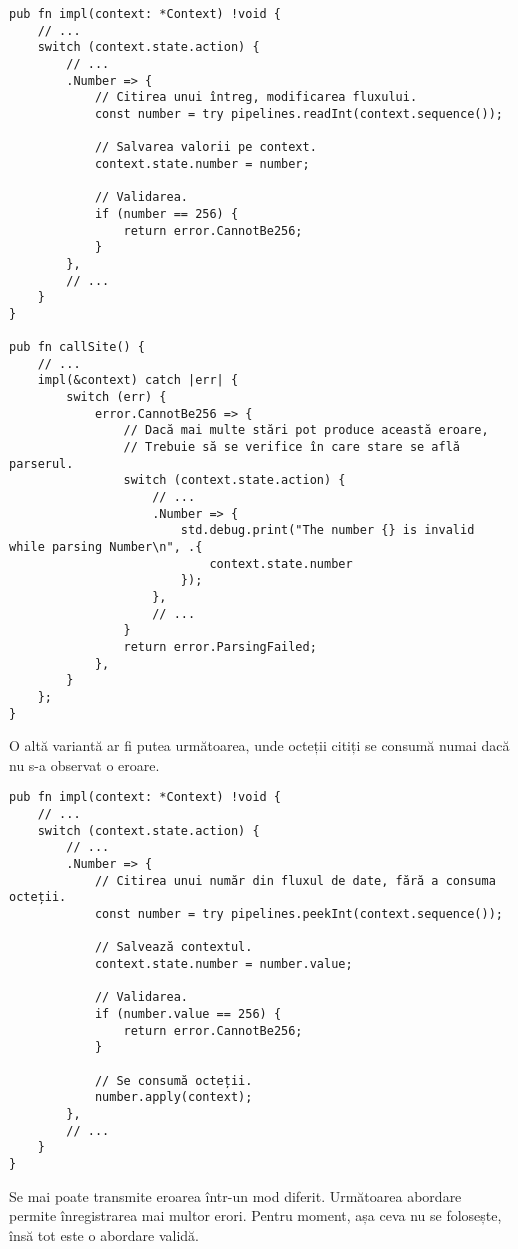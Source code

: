 \documentclass[a4paper,12pt]{report}
\begin{document}
\begin{verbatim}
pub fn impl(context: *Context) !void {
    // ...
    switch (context.state.action) {
        // ...
        .Number => {
            // Citirea unui întreg, modificarea fluxului.
            const number = try pipelines.readInt(context.sequence());

            // Salvarea valorii pe context.
            context.state.number = number;

            // Validarea.
            if (number == 256) {
                return error.CannotBe256;
            }
        },
        // ...
    }
}

pub fn callSite() {
    // ...
    impl(&context) catch |err| {
        switch (err) {
            error.CannotBe256 => {
                // Dacă mai multe stări pot produce această eroare,
                // Trebuie să se verifice în care stare se află parserul.
                switch (context.state.action) {
                    // ...
                    .Number => {
                        std.debug.print("The number {} is invalid while parsing Number\n", .{
                            context.state.number
                        });
                    },
                    // ...
                }
                return error.ParsingFailed;
            },
        }
    };
}
\end{verbatim}

O altă variantă ar fi putea următoarea, unde octeții citiți
se consumă numai dacă nu s-a observat o eroare.

\begin{verbatim}
pub fn impl(context: *Context) !void {
    // ...
    switch (context.state.action) {
        // ...
        .Number => {
            // Citirea unui număr din fluxul de date, fără a consuma octeții.
            const number = try pipelines.peekInt(context.sequence());

            // Salvează contextul.
            context.state.number = number.value;

            // Validarea.
            if (number.value == 256) {
                return error.CannotBe256;
            }

            // Se consumă octeții.
            number.apply(context);
        },
        // ...
    }
}
\end{verbatim}

Se mai poate transmite eroarea într-un mod diferit.
Următoarea abordare permite înregistrarea mai multor erori.
Pentru moment, așa ceva nu se folosește, însă tot este o abordare validă.
\end{document}
